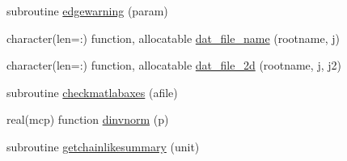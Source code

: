 \begin{DoxyCompactItemize}
\item 
subroutine \mbox{\hyperlink{namespacemcsamples_a083f4a491dcb1c55ed0f61c0e4f435b1}{edgewarning}} (param)
\item 
character(len=\+:) function, allocatable \mbox{\hyperlink{namespacemcsamples_a8613f88e39f47c058447963d5b9f53dc}{dat\+\_\+file\+\_\+name}} (rootname, j)
\item 
character(len=\+:) function, allocatable \mbox{\hyperlink{namespacemcsamples_ab816e54fd85d1f1c125d828e843a2343}{dat\+\_\+file\+\_\+2d}} (rootname, j, j2)
\item 
subroutine \mbox{\hyperlink{namespacemcsamples_ad44656764a16d6b3b6acbbab57653252}{checkmatlabaxes}} (afile)
\item 
real(mcp) function \mbox{\hyperlink{namespacemcsamples_af7511fd6eb58bcc6086256f9ecb5fe1c}{dinvnorm}} (p)
\item 
subroutine \mbox{\hyperlink{namespacemcsamples_a97959f867d590fadb6638910b52409bd}{getchainlikesummary}} (unit)
\end{DoxyCompactItemize}

